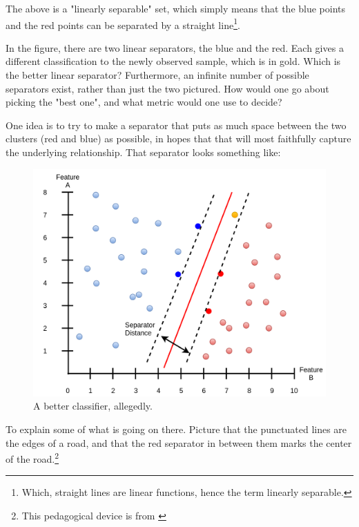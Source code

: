 \documentclass[a4paper, 12pt]{article}
\begin{document}
                        \par The above is a "linearly separable" set, which simply means that the blue points and the red points can be separated by a straight line\footnote{Which, straight lines are linear functions, hence the term linearly separable.}.
                        
                        \par In the figure, there are two linear separators, the blue and the red. Each gives a different classification to the newly observed sample, which is in gold. Which is the better linear separator? Furthermore, an infinite number of possible separators exist, rather than just the two pictured. How would one go about picking the "best one", and what metric would one use to decide?
                        
                        \par One idea is to try to make a separator that puts as much space between the two clusters (red and blue) as possible, in hopes that that will most faithfully capture the underlying relationship. That separator looks something like:
                        
                        \begin{figure}[h]
                            \caption{A better classifier, allegedly.}
                            \centering
                            \includegraphics[width=\textwidth]{betterClassifier}
                        \end{figure} 
                        
                        \par To explain some of what is going on there. Picture that the punctuated lines are the edges of a road, and that the red separator in between them marks the center of the road.\footnote{This pedagogical device is from \cite{mitSupportVectorMachine}}
                    
                    
          
    \printbibliography
\end{document}
